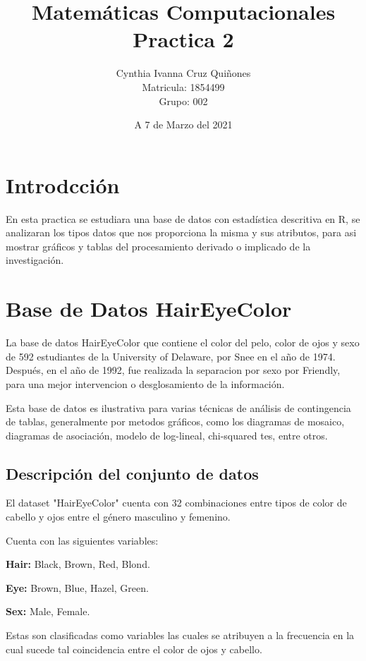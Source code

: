 \documentclass[12pt,a4paper]{article}
\author{Cynthia Ivanna Cruz Quiñones\\
Matricula: 1854499\\
Grupo: 002}
\title{Matemáticas Computacionales\\
Practica 2}
\date{A 7 de Marzo del 2021}
\begin{document}
\maketitle

\newpage
\tableofcontents

\newpage

\section{Introdcción}
En esta practica se estudiara una base de datos con estadística descritiva en R, se analizaran los tipos datos que nos proporciona la misma y sus atributos, para asi mostrar gráficos y tablas del procesamiento derivado o implicado de la investigación.

\section{Base de Datos HairEyeColor}

La base de  datos HairEyeColor\citep{RDocumentation} que contiene el color del pelo, color de ojos y sexo de 592 estudiantes de la University of Delaware, por Snee en el año de 1974. Después, en el año de 1992, fue realizada la separacion por sexo por Friendly, para una mejor intervencion o desglosamiento de la información.

Esta base de datos es ilustrativa para varias técnicas de análisis de contingencia de tablas, generalmente por metodos gráficos, como los diagramas de mosaico, diagramas de asociación, modelo de log-lineal, chi-squared tes, entre otros.


\subsection{Descripción del conjunto de datos}

El dataset "HairEyeColor" cuenta con 32 combinaciones entre tipos de color de cabello y ojos entre el género masculino y femenino.

Cuenta con las siguientes variables:
\begin{list}{•}{}
\item \textbf{Hair:} Black, Brown, Red, Blond.
\item \textbf{Eye:} Brown, Blue, Hazel, Green.
\item \textbf{Sex:} Male, Female.
\end{list}

Estas son clasificadas como variables las cuales se atribuyen a la frecuencia en la cual sucede tal coincidencia entre el color de ojos y cabello.
\end{document}
